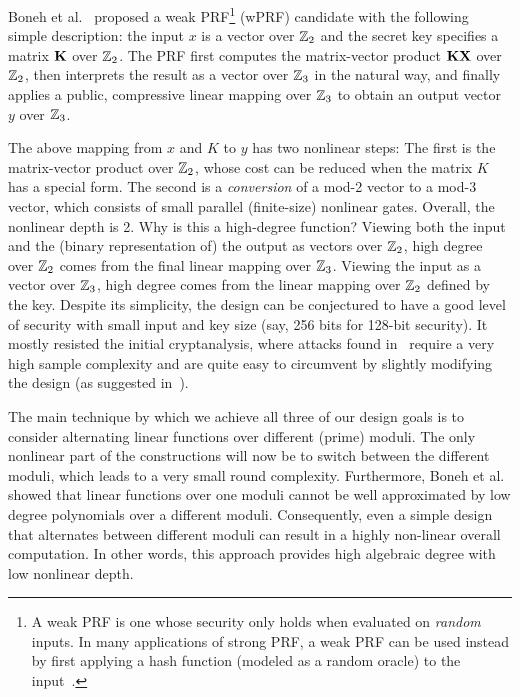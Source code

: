 Boneh et al.~\cite{boneh2018-darkmatter} proposed a weak PRF\footnote{A weak PRF is one whose security only holds when evaluated on {\em random} inputs. In many applications of strong PRF, a weak PRF can be used instead by first applying a hash function (modeled as a random oracle) to the input~\cite{someweakPRFref}.} (wPRF) candidate with the following simple description: the input $x$ is a vector over  $\mathbb{Z}_2$ and the secret key specifies a matrix $\mat{K}$ over  $\mathbb{Z}_2$. The PRF first computes the matrix-vector product $\mat{Kx}$ over  $\mathbb{Z}_2$, then interprets the result as a vector over $\mathbb{Z}_3$ in the natural way,  and finally applies a public, compressive linear mapping over $\mathbb{Z}_3$ to obtain an output vector $y$ over $\mathbb{Z}_3$.

The above mapping from $x$ and $K$ to $y$ has two nonlinear steps: The first is the matrix-vector product over $\mathbb{Z}_2$, whose cost can be reduced when the matrix $K$ has a special form. The second is a {\em conversion} of a mod-2 vector to a mod-3 vector, which consists of small parallel (finite-size) nonlinear gates.  Overall, the nonlinear depth is 2. Why is this a high-degree function? Viewing both the input and the (binary representation of) the output as vectors over $\mathbb{Z}_2$, high degree over $\mathbb{Z}_2$ comes from the final linear mapping over $\mathbb{Z}_3$. Viewing the input as a vector over $\mathbb{Z}_3$, high degree comes from the linear mapping over $\mathbb{Z}_2$ defined by the key.  Despite its simplicity, the design can be conjectured to have a good level of security with small input and key size (say, 256 bits for 128-bit security). It mostly resisted the initial cryptanalysis, where attacks found in~\cite{cheon2020-adventures} require a very high sample complexity and are quite easy to circumvent by slightly modifying the design (as suggested in~\cite{cheon2020-adventures}).

\iffalse
The main technique by which we achieve all three of our design goals is to consider alternating linear functions over different (prime) moduli. The only nonlinear part of the constructions will now be to switch between the different moduli, which leads to a very small round complexity. Furthermore, Boneh et al.~\cite{boneh2018-darkmatter} showed that linear functions over one moduli cannot be well approximated by low degree polynomials over a different moduli. Consequently, even a simple design that alternates between different moduli can result in a highly non-linear overall computation. In other words, this approach provides high algebraic degree with low nonlinear depth. 

